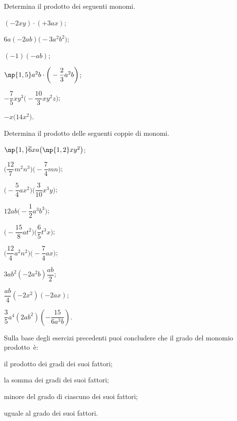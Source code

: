 \begin{esercizio}[\Ast]
 \label{ese:10.13} %
Determina il prodotto dei seguenti monomi.
\begin{multicols}{3}
\begin{enumeratea}
\spazielenx
 \item $(-2xy)\cdot (+3ax)$;
 \item $6a(-2ab)\big(-3a^{2}b^{2}\big)$;
 \item $(-1)(-ab)$;
 \item $\np{1,5}a^{2}b\cdot \bigg(-{\dfrac{2}{3}}a^{2}b\bigg)$;
 \item $-{\dfrac{7}{5}}xy^{3}\bigg(-{\dfrac{10}{3}}xy^{2}z\bigg)$;
 \item $-x\big(14x^{2}\big)$.
\end{enumeratea}
\end{multicols}
\end{esercizio}
\pagebreak
\begin{esercizio}[\Ast]
 \label{ese:10.14} %
Determina il prodotto delle seguenti coppie di monomi.
\begin{multicols}{3}
\begin{enumeratea}
 \item $\np{1,}\overline{{6}}xa\big(\np{1,2}xy^{2}\big)$;
 \item $\bigg(\dfrac{12}{7}m^{2}n^{3}\bigg)\bigg(-{\dfrac{7}{4}}mn\bigg)$;
 \item $\bigg(-{\dfrac{5}{4}}ax^{2}\bigg)\bigg(\dfrac{3}{10}x^{3}y\bigg)$;
 \item $12ab\bigg(-{\dfrac{1}{2}}a^{3}b^{3}\bigg)$;
 \item $\bigg(-{\dfrac{15}{8}}at^{2}\bigg)\bigg(\dfrac{6}{5}t^{3}x\bigg)$;
 \item $\bigg(\dfrac{12}{4}a^{2}n^{2}\bigg)\bigg(-{\dfrac{7}{4}}ax\bigg)$;
 \item $3ab^2\left(-2a^2b\right)\dfrac{ab}{2}$;
 \item $\dfrac{ab}{4}\left(-2x^2\right)(-2ax)$;
 \item $\dfrac{3}{5}a^4\left({2ab^2}\right)\left(-\dfrac{15}{6a^3b}\right)$.
\end{enumeratea}
\end{multicols}
\end{esercizio}


\begin{esercizio}[\Ast]
 \label{ese:10.15} %
Sulla base degli esercizi precedenti puoi concludere che il grado del monomio prodotto~è:

\begin{enumeratea}
 \item il prodotto dei gradi dei suoi fattori;
 \item la somma dei gradi dei suoi fattori;
 \item minore del grado di ciascuno dei suoi fattori;
 \item uguale al grado dei suoi fattori.
\end{enumeratea}
\end{esercizio}

